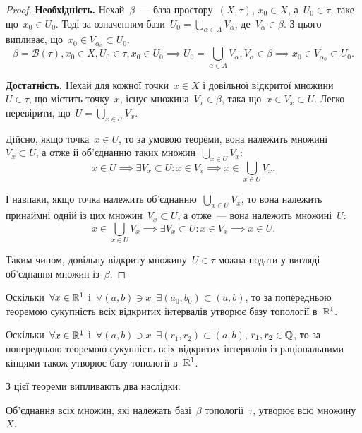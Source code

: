 \begin{proof}
    \textbf{Необхідність.} Нехай~$\beta$~--- база простору~$(X, \tau)$, $x_0 \in X$, а~$U_0 \in \tau$, таке що~$x_0 \in U_0$. Тоді за означенням бази~$U_0 = \bigcup_{\alpha \in A} V_\alpha$, де~$V_\alpha \in \beta$. З цього випливає, що~$x_0 \in V_{\alpha_0} \subset U_0$.
    \begin{equation*}
        \beta = \mathcal{B}(\tau), x_0 \in X, U_0 \in \tau, x_0 \in U_0 \implies U_0 = \bigcup_{\alpha \in A} V_\alpha, V_\alpha \in \beta \implies x_0 \in V_{\alpha_0} \subset U_0.
    \end{equation*}

    \textbf{Достатність.} Нехай для кожної точки~$x \in X$ і довільної відкритої множини~$U \in \tau$, що містить точку~$x$, існує множина~$V_x \in \beta$, така що~$x \in V_x \subset U$. Легко перевірити, що~$U = \bigcup_{x \in U} V_x$.

    Дійсно, якщо точка~$x \in U$, то за умовою теореми, вона належить множині~$V_x \subset U$, а отже й об'єднанню таких множин~$\bigcup_{x \in U} V_x$: \[ x \in U \implies \exists V_x \subset U: x \in V_x \implies x \in \bigcup_{x \in U} V_x. \]

    І навпаки, якщо точка належить об'єднанню~$\bigcup_{x \in U} V_x$, то вона належить принаймні одній із цих множин~$V_x \subset U$, а отже~--- вона належить множині~$U$: \[ x \in \bigcup_{x \in U} V_x \implies \exists V_x \subset U: x \in V_x \implies x \in U. \]

    Таким чином, довільну відкриту множину~$U \in \tau$ можна подати у вигляді об'єд\-нання множин із~$\beta$.
\end{proof}

\begin{example}
    Оскільки~$\forall x \in \mathbb{R}^1$ і~$\forall (a, b) \ni x$~$\exists(a_0, b_0) \subset (a, b)$, то за попередньою теоремою сукупність всіх відкритих інтервалів утворює базу топології в~$\mathbb{R}^1$.
\end{example}

\begin{example}
    Оскільки~$\forall x \in \mathbb{R}^1$ і~$\forall (a, b) \ni x$~$\exists (r_1, r_2) \subset (a, b)$, $r_1, r_2 \in \mathbb{Q}$, то за попередньою теоремою сукупність всіх відкритих інтервалів із раціональними кінцями також утворює базу топології в~$\mathbb{R}^1$.
\end{example}

З цієї теореми випливають два наслідки.

\begin{corollary}
    Об'єднання всіх множин, які належать базі~$\beta$ топології~$\tau$, утворює всю множину~$X$.
\end{corollary}

